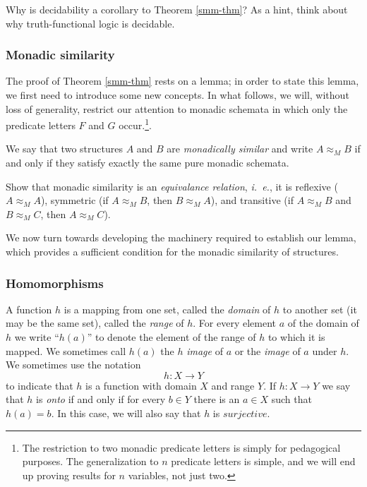 \begin{aside}
    Why is decidability a corollary to Theorem \ref{smm-thm}? As a hint, think about why truth-functional logic is decidable.
\end{aside}

\subsubsection*{Monadic similarity}
The proof of Theorem \ref{smm-thm} rests on a lemma; in order to state this lemma, we first need to introduce some new concepts. In what follows, we will, without loss of generality, restrict our attention to monadic schemata in which only the predicate letters $F$ and $G$ occur.\footnote{The restriction to two monadic predicate letters is simply for pedagogical purposes. The generalization to $n$ predicate letters is simple, and we will end up proving results for $n$ variables, not just two.}. %

\begin{definition}
    We say that two structures $A$ and $B$ are {\em monadically similar} and write $A \approx_M B$ if and
only if they satisfy exactly the same pure monadic schemata.
\end{definition}

\begin{aside}
    Show that monadic similarity is an \emph{equivalance relation}, \emph{i.~e.}, it is reflexive ($A \approx_M A$), symmetric (if $A \approx_M B$, then $B \approx_M A$), and transitive (if $A \approx_M B$ and $B \approx_M C$, then $A \approx_M C$). 
\end{aside}

We now turn towards developing the machinery required to establish our lemma, which provides a sufficient condition for the monadic similarity of structures.


\subsubsection*{Homomorphisms}

A function $h$ is a mapping from one set, called the {\em domain} of $h$ to
another set (it may be the same set), called the {\em range} of $h.$ For every
element $a$ of the domain of $h$ we write ``$h(a)$'' to denote the element of
the 
range of $h$ to which it is mapped. We sometimes call $h(a)$ the $h$ {\em
image} of 
$a$ or the {\em image} of $a$ under $h.$ We sometimes use the notation
$$h: X \longrightarrow Y$$
to indicate that $h$ is a function with domain $X$ and range $Y.$
If $h: X \longrightarrow Y$ we say that $h$ is {\em onto} if and only if for
every 
$b\in Y$ there is an $a \in X$ such that $h(a)=b.$
In this case, we will also say that $h$ is $surjective.$

